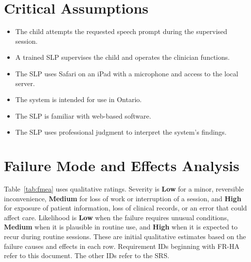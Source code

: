 \documentclass{article}
\begin{document}
\section{Critical Assumptions}

\begin{itemize}
    \item The child attempts the requested speech prompt during the supervised session.
    \item A trained SLP supervises the child and operates the clinician functions.
    \item The SLP uses Safari on an iPad with a microphone and access to the local server.
    \item The system is intended for use in Ontario.
    \item The SLP is familiar with web-based software.
    \item The SLP uses professional judgment to interpret the system's findings.
\end{itemize}

\section{Failure Mode and Effects Analysis} \label{sec:fmea}

Table~\ref{tab:fmea} uses qualitative ratings. Severity is \textbf{Low} for a
minor, reversible inconvenience, \textbf{Medium} for loss of work or
interruption of a session, and \textbf{High} for exposure of patient
information, loss of clinical records, or an error that could affect care.
Likelihood is \textbf{Low} when the failure requires unusual conditions,
\textbf{Medium} when it is plausible in routine use, and \textbf{High} when
it is expected to recur during routine sessions. These are initial qualitative estimates based on the
failure causes and effects in each row. Requirement IDs beginning with
FR-HA refer to this document. The other IDs refer to the SRS.
\end{document}
